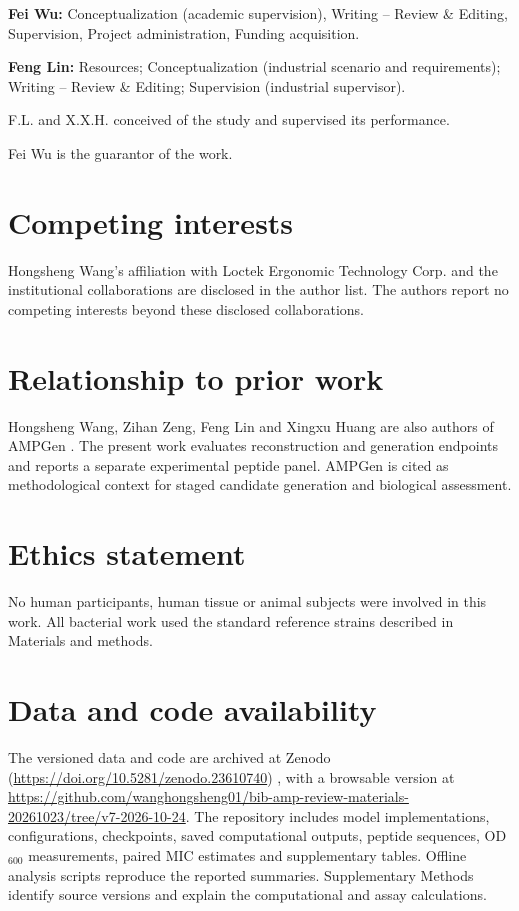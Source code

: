 \documentclass[unnumsec,webpdf,contemporary,large]{oup-authoring-template}
\begin{document}
\textbf{Fei Wu:} Conceptualization (academic supervision), Writing -- Review \& Editing, Supervision, Project administration, Funding acquisition.

\textbf{Feng Lin:} Resources; Conceptualization (industrial scenario and requirements); Writing -- Review \& Editing; Supervision (industrial supervisor).

F.L. and X.X.H. conceived of the study and supervised its performance.

Fei Wu is the guarantor of the work.

\section*{Competing interests}

Hongsheng Wang's affiliation with Loctek Ergonomic Technology Corp. and the institutional collaborations are disclosed in the author list. The authors report no competing interests beyond these disclosed collaborations.

\section*{Relationship to prior work}
Hongsheng Wang, Zihan Zeng, Feng Lin and Xingxu Huang are also authors of AMPGen \cite{ref9}. The present work evaluates reconstruction and generation endpoints and reports a separate experimental peptide panel. AMPGen is cited as methodological context for staged candidate generation and biological assessment.

\section*{Ethics statement}

No human participants, human tissue or animal subjects were involved in this work. All bacterial work used the standard reference strains described in Materials and methods.

\section*{Data and code availability}
The versioned data and code are archived at Zenodo (\url{https://doi.org/10.5281/zenodo.23610740}) \cite{refData}, with a browsable version at \url{https://github.com/wanghongsheng01/bib-amp-review-materials-20261023/tree/v7-2026-10-24}. The repository includes model implementations, configurations, checkpoints, saved computational outputs, peptide sequences, OD$_{600}$ measurements, paired MIC estimates and supplementary tables. Offline analysis scripts reproduce the reported summaries. Supplementary Methods identify source versions and explain the computational and assay calculations.
\end{document}
